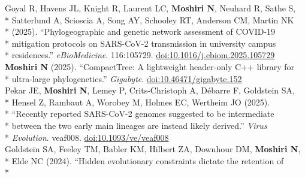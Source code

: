\documentclass[margin,line]{res}
\begin{document}
\begin{resume}
\hspace*{9.5mm} Goyal R, Havens JL, Knight R, Laurent LC, \textbf{Moshiri N}, Neuhard R, Sathe S,\\*
\hspace*{9.5mm} Satterlund A, Scioscia A, Song AY, Schooley RT, Anderson CM, Martin NK\\*
\hspace*{9.5mm} (2025). ``Phylogeographic and genetic network assessment of COVID-19\\*
\hspace*{9.5mm} mitigation protocols on SARS-CoV-2 transmission in university campus\\*\vspace{2mm}
\hspace*{8mm} residences.'' \textit{eBioMedicine}. 116:105729. \href{https://doi.org/10.1016/j.ebiom.2025.105729}{doi:10.1016/j.ebiom.2025.105729}\\
\hspace*{4mm} \textbf{Moshiri N} (2025). ``CompactTree: A lightweight header-only C++ library for\\*\vspace{2mm}
\hspace*{8mm} ultra-large phylogenetics.'' \textit{Gigabyte}. \href{https://doi.org/10.46471/gigabyte.152}{doi:10.46471/gigabyte.152}\\
\hspace*{4mm} Pekar JE, \textbf{Moshiri N}, Lemey P, Crits-Christoph A, D\'ebarre F, Goldstein SA,\\*
\hspace*{9.5mm} Hensel Z, Rambaut A, Worobey M, Holmes EC, Wertheim JO (2025).\\*
\hspace*{9.5mm} ``Recently reported SARS-CoV-2 genomes suggested to be intermediate\\*
\hspace*{9.5mm} between the two early main lineages are instead likely derived.'' \textit{Virus}\\*\vspace{2mm}
\hspace*{8mm} \textit{Evolution}. veaf008. \href{https://doi.org/10.1093/ve/veaf008}{doi:10.1093/ve/veaf008}\\
\hspace*{4mm} Goldstein SA, Feeley TM, Babler KM, Hilbert ZA, Downhour DM, \textbf{Moshiri N},\\*
\hspace*{9.5mm} Elde NC (2024). ``Hidden evolutionary constraints dictate the retention of\\*

\end{resume}
\end{document}
